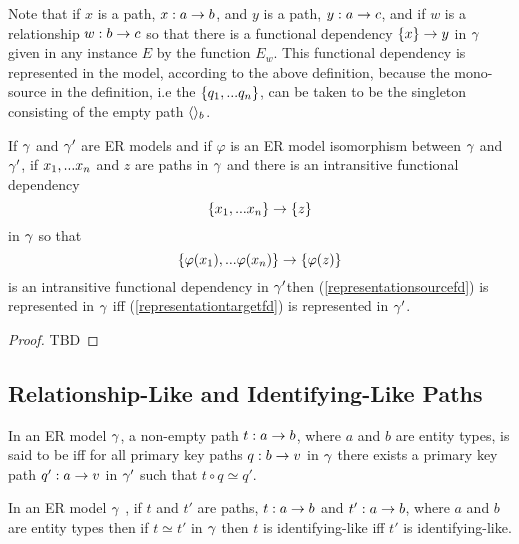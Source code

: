 Note that  if $x$ is a path, $x:a \rightarrow b$, and $y$ is a path, $y: a \rightarrow c$, and if $w$ is a
relationship $w: b \rightarrow c$ so that there is a functional dependency $\left\{x\right\} \rightarrow y$ in $\gamma$
given in any instance $E$ by the function $E_w$. This functional dependency is represented in the model, according to the above definition, because the mono-source in the definition, i.e the $\left\{q_1,...q_n\right\}$,
can be taken to be the singleton consisting of the empty path $\langle\rangle_b$. \\

\begin{lemma}
If $\gamma$ and $\gamma'$ are ER models and  if  $\varphi$ is an ER model isomorphism between $\gamma$  and $\gamma'$,  if $x_1,...x_n$ and $z$ are paths in $\gamma$
and there is an  intransitive functional dependency
\begin{equation}
\label{representationsourcefd}
\left\{x_1,...x_n\right\} \rightarrow \left\{z\right\}
\end{equation} 
in $\gamma$
so that
\begin{equation}
\label{representationtargetfd}
\left\{\varphi(x_1),...\varphi(x_n)\right\} \rightarrow \left\{\varphi(z)\right\}
\end{equation}
is an intransitive  functional dependency in $\gamma'$then
(\ref{representationsourcefd}) is represented in $\gamma$ iff
(\ref{representationtargetfd}) is represented in $\gamma'$.
\end{lemma}
\begin{proof}
TBD
\end{proof}

\subsection{Relationship-Like and Identifying-Like Paths}

\begin{definition}
In an ER model $\gamma$, a non-empty path $t: a \rightarrow b$, where $a$ and $b$ are entity types, is said to be  iff  for all primary key paths $q:b \rightarrow v$ in $\gamma$ there exists a primary key path $q':a \rightarrow v$ in $\gamma'$ such that $t \circ q \simeq q'$.
\end{definition}

\begin{lemma}
In an ER model $\gamma$ , if $t$ and $t'$ are paths, $t:a \rightarrow b$ and $t':a \rightarrow b$, where $a$ and $b$ are entity types
then if $t \simeq t'$ in $\gamma$ then $t$ is identifying-like iff $t'$ is identifying-like.
\end{lemma}

